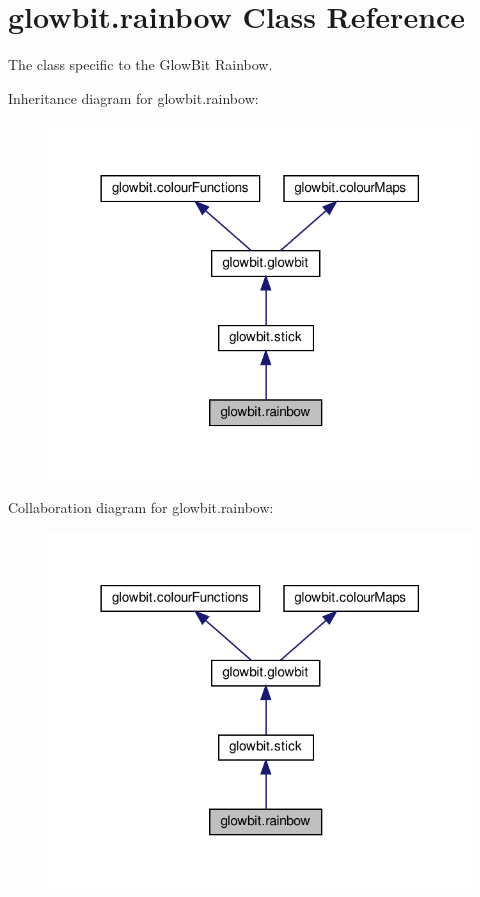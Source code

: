 \hypertarget{classglowbit_1_1rainbow}{}\section{glowbit.\+rainbow Class Reference}
\label{classglowbit_1_1rainbow}


The class specific to the Glow\+Bit Rainbow.  




Inheritance diagram for glowbit.\+rainbow\+:\nopagebreak
\begin{figure}[H]
\begin{center}
\leavevmode
\includegraphics[width=318pt]{classglowbit_1_1rainbow__inherit__graph}
\end{center}
\end{figure}


Collaboration diagram for glowbit.\+rainbow\+:\nopagebreak
\begin{figure}[H]
\begin{center}
\leavevmode
\includegraphics[width=318pt]{classglowbit_1_1rainbow__coll__graph}
\end{center}
\end{figure}
